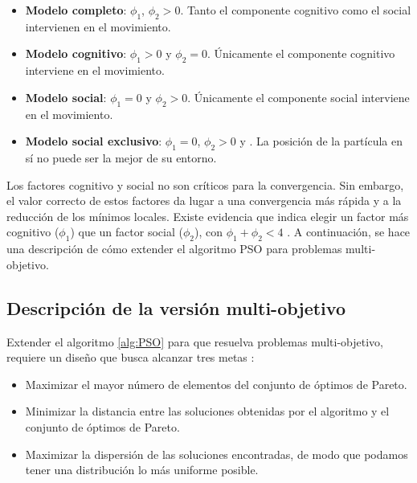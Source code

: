     \begin{itemize}
     \item \textbf{Modelo completo}: $\phi_1$, $\phi_2 > 0$. Tanto el componente cognitivo como el social intervienen en el movimiento.
     \item \textbf{Modelo cognitivo}: $\phi_1 > 0$ y $\phi_2 = 0$. \'Unicamente el componente cognitivo interviene en el movimiento.
     \item \textbf{Modelo social}: $\phi_1 = 0$ y $\phi_2 > 0$. \'Unicamente el componente social interviene en el movimiento.
     \item \textbf{Modelo social exclusivo}: $\phi_1 = 0$, $\phi_2 > 0$ y \DIFdelbegin {}\DIFdelend \DIFaddbegin {}\DIFaddend . La posici\'on de la part\'icula en s\'i no puede 
     ser la mejor de su entorno.

    \end{itemize}

    Los factores cognitivo y social no son cr\'iticos para la convergencia. Sin embargo, el valor correcto de estos 
    factores da lugar a una convergencia m\'as r\'apida y a la reducci\'on de los m\'inimos locales. Existe evidencia 
    que indica \DIFaddbegin {}\DIFaddend elegir un factor m\'as cognitivo ($\phi_1$) que un factor social ($\phi_2$), con $\phi_1 + \phi_2 < 4$ 
    \cite{Maurice11}. A continuaci\'on, se hace una descripci\'on de c\'omo extender el algoritmo PSO para problemas multi-objetivo.

  \subsection{Descripci\'on de la versi\'on multi-objetivo}

  Extender el algoritmo \ref{alg:PSO} para que resuelva problemas multi-objetivo, requiere un dise\~no que busca alcanzar tres metas
  \cite{Nik11}:

  \begin{itemize}
   \item Maximizar el mayor n\'umero de elementos del conjunto de \'optimos de Pareto.
   \item Minimizar la distancia entre las soluciones obtenidas por el algoritmo y el conjunto de \'optimos de Pareto.
   \item Maximizar la dispersi\'on de las soluciones encontradas, de modo que podamos tener una distribuci\'on lo m\'as 
	uniforme posible.
  \end{itemize}

